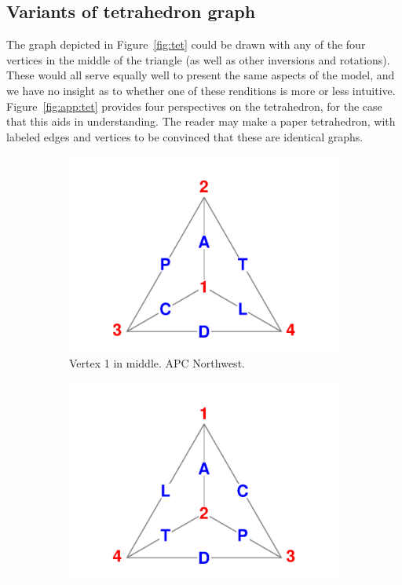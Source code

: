 \documentclass[12pt,oneside,letter]{article} %
\newcommand\vt[1]{\textcolor{rd}{#1}}
\begin{document}
\begin{appendices}
\section{Variants of tetrahedron graph}
The graph depicted in Figure~\ref{fig:tet} could be drawn with any of the
four vertices in the middle of the triangle (as well as other inversions
and rotations).
These would all serve equally well to present the same aspects of the model, and
we have no insight as to whether one of these renditions is more or less
intuitive. Figure~\ref{fig:app:tet} provides four perspectives on the
tetrahedron, for the case that this aids in understanding. The reader may make a
paper tetrahedron, with labeled edges and vertices to be convinced that
these are identical graphs.
\begin{figure}
        \centering
        \caption{Some variants of the graph of the APCTDL tetrahedron.} 
         \label{fig:app:tet}
        \begin{subfigure}[b]{0.475\textwidth}
            \centering
            \includegraphics[width=\textwidth]{Figures/Tetra1.pdf}
           \caption{\small Vertex \vt{1} in middle. APC Northwest.}
            \label{fig:tet1}
        \end{subfigure}
        \hfill
        \begin{subfigure}[b]{0.475\textwidth}  
            \centering 
            \includegraphics[width=\textwidth]{Figures/Tetra2.pdf}

\end{subfigure}
\end{figure}
\end{appendices}
\end{document}
